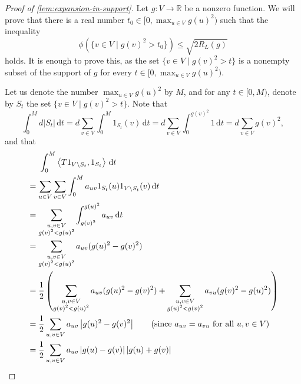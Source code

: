 \documentclass[12pt,a4paper,bold]{thesis}
\theoremstyle{definition}
\newcommand*{\map}[3]{#1 \colon #2 \to #3}
\newcommand*{\abs}[1]{\left\vert #1 \right\vert}
\newcommand*{\ip}[2]{\left\langle #1 , #2 \right\rangle}
\begin{document}
\begin{proof}[Proof of \cref{lem:expansion-in-support}]
    Let $\map{g}{V}{\mathbb{R}}$ be a nonzero function. We will prove that 
    there is a real number $t_0 \in [0, \max_{u  \in V} g(u)^2)$ such that the inequality
    \begin{equation*}
        \phi(\{v \in V \mid g(v)^2 > t_0\}) \leq \sqrt{2 R_L(g)}
    \end{equation*}
    holds. It is enough to prove this, as the set $\{v \in V \mid g(v)^2 > t\}$ is 
    a nonempty subset of the support of $g$ for every $t \in [0, \max_{u  \in V} g(u)^2)$.

    Let us denote the number $\max_{u  \in V} g(u)^2$ by $M$, and for any $t \in [0,M)$, 
    denote by $S_t$ the set $\{v \in V \mid g(v)^2 > t\}$. Note that
    \begin{equation*}
        \int_{0}^{M} d \abs{S_t}\, \mathrm{d}t 
        = d \sum_{v \in V} \int_{0}^{M} 1_{S_t}(v)\, \mathrm{d}t
        = d \sum_{v \in V} \int_{0}^{g(v)^2} 1\, \mathrm{d}t
        = d \sum_{v \in V} g(v)^2,
    \end{equation*}
    and that
    \begin{align*}
        & \hspace{0.49cm}
		\int_{0}^{M} \ip{T1_{V \setminus S_t}}{1_{S_t}}\, \mathrm{d}t
		\\
        & =
        \sum_{u \in V} \sum_{v \in V} \int_{0}^{M} 
        a_{uv} 1_{S_t}(u) 1_{V \setminus S_t}(v)\, \mathrm{d}t
        \\
        & =
        \sum_{\substack{u,v \in V \\ g(v)^2 < g(u)^2}} \int_{g(v)^2}^{g(u)^2} a_{uv}\, \mathrm{d}t
        \\
        & =
        \sum_{\substack{u,v \in V \\ g(v)^2 < g(u)^2}} a_{uv} (g(u)^2 - g(v)^2)
        \\
        & =
        \frac{1}{2} \left(\sum_{\substack{u,v \in V \\ g(v)^2 < g(u)^2}} a_{uv} (g(u)^2 - g(v)^2)
        + \sum_{\substack{u,v \in V \\ g(u)^2 < g(v)^2}} a_{vu} (g(v)^2 - g(u)^2)\right)
        \\
        & =
        \frac{1}{2} \sum_{u,v \in V} a_{uv} \abs{g(u)^2 - g(v)^2} 
        \tag{since $a_{uv} = a_{vu}$ for all $u, v \in V$}
        \\
        & =
        \frac{1}{2} \sum_{u,v \in V} a_{uv} \abs{g(u) - g(v)} \abs{g(u) + g(v)}
        \\

\end{align*}
\end{proof}
\end{document}
